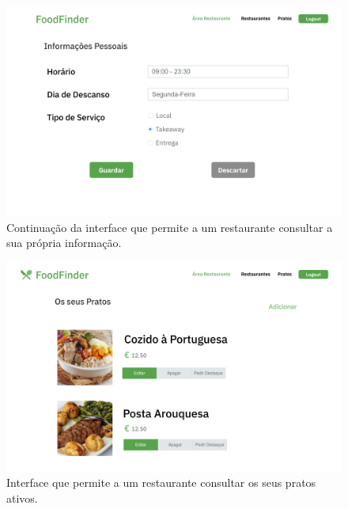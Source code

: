 \documentclass[a4paper,12pt]{report}
\begin{document}
	\begin{figure}[H]
	\begin{center}
	\includegraphics[scale=0.25]{5.1-Edtiar_Dados_restaurante_2}	
	\end{center}
	\caption{Continuação da interface que permite a um restaurante consultar a sua própria informação.}
	\end{figure} 

	\begin{figure}[H]
	\begin{center}
	\includegraphics[scale=0.25]{6.1-Pratos_Dia_Ativos_restaurante_1}	
	\end{center}
	\caption{Interface que permite a um restaurante consultar os seus pratos ativos.}
	\end{figure}
\end{document}
